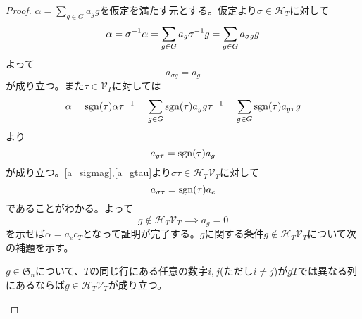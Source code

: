 \documentclass{ltjsarticle}
\begin{document}
\begin{proof}
  $\alpha=\sum_{g\in G}a_gg$を仮定を満たす元とする。仮定より$\sigma\in \mathcal{H}_T$に対して
  \[
  \alpha=\sigma^{-1}\alpha=\sum_{g\in G}a_g\sigma^{-1} g=\sum_{g\in G}a_{\sigma g}g
  \]
  よって
  \begin{equation}
    a_{\sigma g}=a_g  \label{a_sigmag}
  \end{equation}
  が成り立つ。また$\tau\in\mathcal{V}_T$に対しては
  \[
  \alpha=\mathrm{sgn}(\tau)\alpha\tau^{-1}=\sum_{g\in G}\mathrm{sgn}(\tau)a_gg\tau^{-1}=\sum_{g\in G}\mathrm{sgn}(\tau)a_{g\tau}{g}
  \]
  より
  \begin{equation}
    a_{g\tau}=\mathrm{sgn}(\tau)a_g  \label{a_gtau}
  \end{equation}
  が成り立つ。\ref{a_sigmag},\ref{a_gtau}より$\sigma\tau\in\mathcal{H}_T\mathcal{V}_T$に対して
  \[
  a_{\sigma\tau}=\mathrm{sgn}(\tau)a_{e}  
  \]
  であることがわかる。よって
  \begin{equation}
  g\notin\mathcal{H}_T\mathcal{V}_T\implies a_g=0 \label{lemm:coefficient_zero} 
  \end{equation}
  を示せば$\alpha=a_ec_T$となって証明が完了する。$g$に関する条件$g\notin\mathcal{H}_T\mathcal{V}_T$について次の補題を示す。
  \begin{lemm}\label{lamm:117}
    $g\in\mathfrak{S}_n$について、$T$の同じ行にある任意の数字$i,j$(ただし$i\neq j$)が$gT$では異なる列にあるならば$g\in\mathcal{H}_T\mathcal{V}_T$が成り立つ。
  \end{lemm}


\end{proof}
\end{document}
